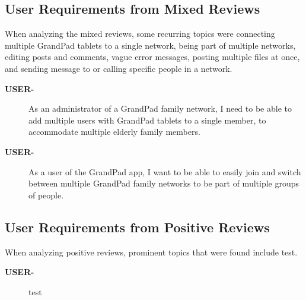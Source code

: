 \subsection*{User Requirements from Mixed Reviews}

When analyzing the mixed reviews, some recurring topics were
    connecting multiple GrandPad tablets to a single network,
    being part of multiple networks,
    editing posts and comments,
    vague error messages,
    posting multiple files at once,
    and sending message to or calling specific people in a network.

\begin{description}
    \item[\textbf{USER-\showmycounter}]
        As an administrator of a GrandPad family network, I need to be able to
            add multiple users with GrandPad tablets to a single member, to
            accommodate multiple elderly family members.
    \item[\textbf{USER-\showmycounter}]
        As a user of the GrandPad app, I want to be able to easily join and
            switch between multiple GrandPad family networks to be part of
            multiple groups of people.
\end{description}

\subsection*{User Requirements from Positive Reviews}

When analyzing positive reviews, prominent topics that were found include
    test.

\begin{description}
    \item[\textbf{USER-\showmycounter}]
        test
\end{description}
